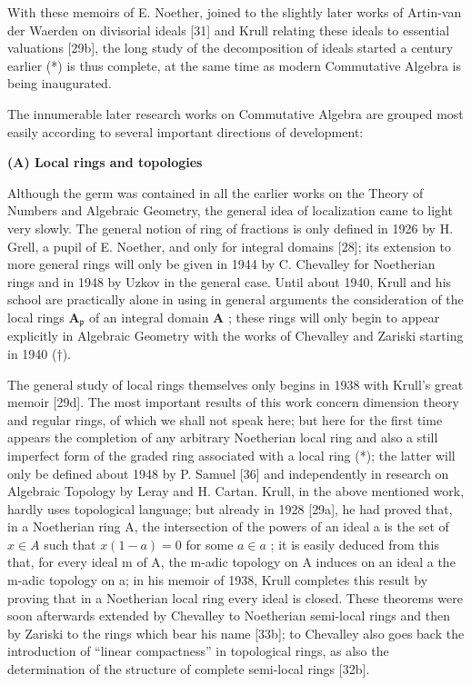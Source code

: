 With these memoirs of E. Noether, joined to the slightly later works of Artin-van der Waerden on divisorial ideals {[}31{]} and Krull relating these ideals to essential valuations {[}29b{]}, the long study of the decomposition of ideals started a century earlier (*) is thus complete, at the same time as modern Commutative Algebra is being inaugurated.

The innumerable later research works on Commutative Algebra are grouped most easily according to several important directions of development:

\textbf{(A) Local rings and topologies}\par

Although the germ was contained in all the earlier works on the Theory of Numbers and Algebraic Geometry, the general idea of localization came to light very slowly. The general notion of ring of fractions is only defined in 1926 by H. Grell, a pupil of E. Noether, and only for integral domains {[}28{]}; its extension to more general rings will only be given in 1944 by C. Chevalley for Noetherian rings and in 1948 by Uzkov in the general case. Until about 1940, Krull and his school are practically alone in using in general arguments the consideration of the local rings \(\mathbf{A}_{\mathfrak{p}}\) of an integral domain \(\mathbf{A}\) ; these rings will only begin to appear explicitly in Algebraic Geometry with the works of Chevalley and Zariski starting in 1940 (†).

The general study of local rings themselves only begins in 1938 with Krull's great memoir {[}29d{]}. The most important results of this work concern dimension theory and regular rings, of which we shall not speak here; but here for the first time appears the completion of any arbitrary Noetherian local ring and also a still imperfect form of the graded ring associated with a local ring (*); the latter will only be defined about 1948 by P. Samuel {[}36{]} and independently in research on Algebraic Topology by Leray and H. Cartan. Krull, in the above mentioned work, hardly uses topological language; but already in 1928 {[}29a{]}, he had proved that, in a Noetherian ring A, the intersection of the powers of an ideal a is the set of \(x \in A\) such that \(x(1 - a) = 0\) for some \(a \in a\) ; it is easily deduced from this that, for every ideal m of A, the m-adic topology on A induces on an ideal a the m-adic topology on a; in his memoir of 1938, Krull completes this result by proving that in a Noetherian local ring every ideal is closed. These theorems were soon afterwards extended by Chevalley to Noetherian semi-local rings and then by Zariski to the rings which bear his name {[}33b{]}; to Chevalley also goes back the introduction of ``linear compactness'' in topological rings, as also the determination of the structure of complete semi-local rings {[}32b{]}.


